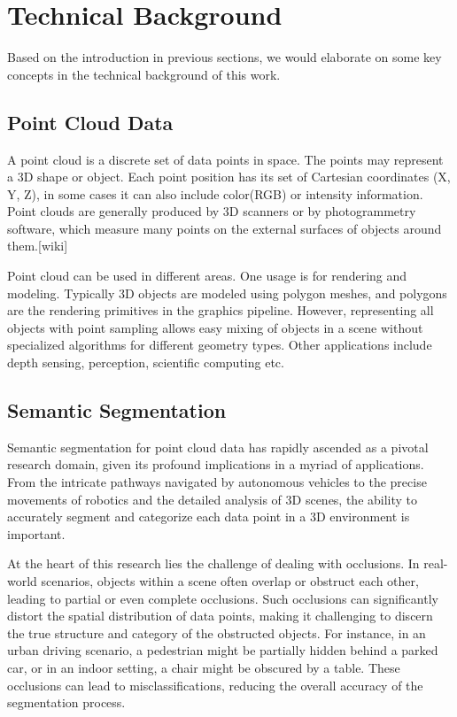 \documentclass[11pt, a4paper,oneside,chapterprefix=false]{scrbook}
\begin{document}
\section{Technical Background}

Based on the introduction in previous sections, we would elaborate on some key concepts in the technical background of this work.

\subsection{Point Cloud Data}

A point cloud is a discrete set of data points in space. The points may represent a 3D shape or object. Each point position has its set of Cartesian coordinates (X, Y, Z), in some cases it can also include color(RGB) or intensity information. Point clouds are generally produced by 3D scanners or by photogrammetry software, which measure many points on the external surfaces of objects around them.[wiki] 

\vspace{10pt}

Point cloud can be used in different areas. One usage is for rendering and modeling. Typically 3D objects are modeled using polygon meshes, and  polygons are the rendering primitives in the graphics pipeline. However, representing all objects with point sampling allows easy mixing of objects in a scene without specialized algorithms for different geometry types. Other applications include depth sensing, perception, scientific computing etc.

\subsection{Semantic Segmentation}

Semantic segmentation for point cloud data has rapidly ascended as a pivotal research domain, given its profound implications in a myriad of applications. From the intricate pathways navigated by autonomous vehicles to the precise movements of robotics and the detailed analysis of 3D scenes, the ability to accurately segment and categorize each data point in a 3D environment is important.

\vspace{10pt}

At the heart of this research lies the challenge of dealing with occlusions. In real-world scenarios, objects within a scene often overlap or obstruct each other, leading to partial or even complete occlusions. Such occlusions can significantly distort the spatial distribution of data points, making it challenging to discern the true structure and category of the obstructed objects. For instance, in an urban driving scenario, a pedestrian might be partially hidden behind a parked car, or in an indoor setting, a chair might be obscured by a table. These occlusions can lead to misclassifications, reducing the overall accuracy of the segmentation process.
\end{document}
